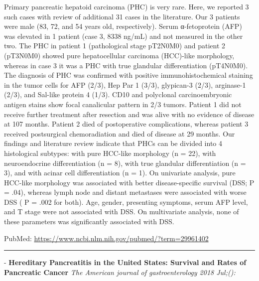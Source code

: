 \documentclass[]{article}
\begin{document}
Primary pancreatic hepatoid carcinoma (PHC) is very rare. Here, we
reported 3 such cases with review of additional 31 cases in the
literature. Our 3 patients were male (83, 72, and 54 years old,
respectively). Serum α-fetoprotein (AFP) was elevated in 1 patient (case
3, 8338 ng/mL) and not measured in the other two. The PHC in patient 1
(pathological stage pT2N0M0) and patient 2 (pT3N0M0) showed pure
hepatocellular carcinoma (HCC)-like morphology, whereas in case 3 it was
a PHC with true glandular differentiation (pT4N0M0). The diagnosis of
PHC was confirmed with positive immunohistochemical staining in the
tumor cells for AFP (2/3), Hep Par 1 (3/3), glypican-3 (2/3), arginase-1
(2/3), and Sal-like protein 4 (1/3). CD10 and polyclonal
carcinoembryonic antigen stains show focal canalicular pattern in 2/3
tumors. Patient 1 did not receive further treatment after resection and
was alive with no evidence of disease at 107 months. Patient 2 died of
postoperative complications, whereas patient 3 received postsurgical
chemoradiation and died of disease at 29 months. Our findings and
literature review indicate that PHCs can be divided into 4 histological
subtypes: with pure HCC-like morphology (n = 22), with neuroendocrine
differentiation (n = 8), with true glandular differentiation (n = 3),
and with acinar cell differentiation (n = 1). On univariate analysis,
pure HCC-like morphology was associated with better disease-specific
survival (DSS; P = .04), whereas lymph node and distant metastases were
associated with worse DSS ( P = .002 for both). Age, gender, presenting
symptoms, serum AFP level, and T stage were not associated with DSS. On
multivariate analysis, none of these parameters was significantly
associated with DSS.

PubMed: \url{https://www.ncbi.nlm.nih.gov/pubmed/?term=29961402}

{}

{}

\begin{center}\rule{0.5\linewidth}{\linethickness}\end{center}

 - \textbf{Hereditary Pancreatitis in the United States: Survival and
Rates of Pancreatic Cancer} \emph{The American journal of
gastroenterology 2018 Jul;():}
\end{document}
